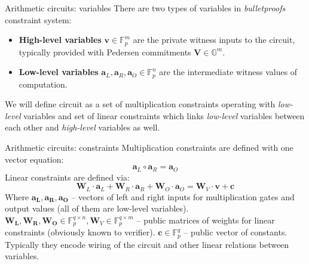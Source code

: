 \documentclass{zkdl-presentation-template}
\begin{document}
    \begin{frame}{Arithmetic circuits: variables}
        There are two types of variables in \textit{bulletproofs} constraint system:
        \begin{itemize}
            \item \textbf{High-level variables} $\mathbf{v} \in \mathbb{F}_p^m$ are the private witness inputs to the circuit, typically provided with Pedersen commitments $\mathbf{V} \in \mathbb{G}^m$.\pause
            \item \textbf{Low-level variables} $\mathbf{a}_L, \mathbf{a}_R, \mathbf{a}_O \in \mathbb{F}_p^n$ are the intermediate witness values of computation.
        \end{itemize}
        \pause
        We will define circuit as a set of multiplication constraints operating with \textit{low-level} variables and set of linear constraints which links \textit{low-level} variables between each other and \textit{high-level} variables as well.
    \end{frame}

    \begin{frame}{Arithmetic circuits: constraints}
        Multiplication constraints are defined with one vector equation:
        $$ \mathbf{a}_L \circ \mathbf{a}_R = \mathbf{a}_O $$
        \pause
        Linear constraints are defined via:
        $$ \mathbf{W}_L \cdot \mathbf{a}_L + \mathbf{W}_R \cdot \mathbf{a}_R + \mathbf{W}_O \cdot \mathbf{a}_O = \mathbf{W}_V \cdot \mathbf{v} + \mathbf{c} $$
        \pause
        Where $\mathbf{a_L, a_R, a_O}$ -- vectors of left and right inputs for multiplication gates and output values (all of them are low-level variables). $\mathbf{W_L, W_R, W_O} \in \mathbb{F}_p^{q \times n}, \mathbf{W}_V \in \mathbb{F}_p^{q \times m}$ -- public matrices of weights for linear constraints (obviously known to verifier). $\mathbf{c} \in \mathbb{F}_p^q$ -- public vector of constants. Typically they encode wiring of the circuit and other linear relations between variables.
    \end{frame}
\end{document}

